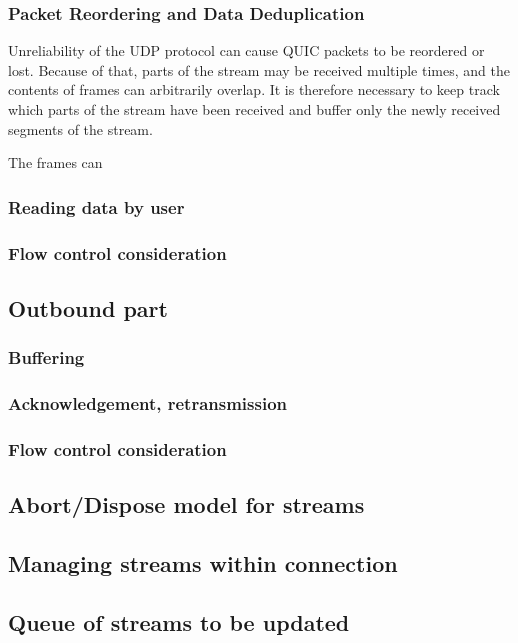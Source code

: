 \subsubsection{Packet Reordering and Data Deduplication}

Unreliability of the UDP protocol can cause QUIC packets to be reordered or lost. Because of that,
parts of the stream may be received multiple times, and the contents of \STREAM{} frames can
arbitrarily overlap. It is therefore necessary to keep track which parts of the stream have been
received and buffer only the newly received segments of the stream.



The \STREAM{} frames can

\subsubsection{Reading data by user}
\subsubsection{Flow control consideration}

\subsection{Outbound part}

\subsubsection{Buffering}
\subsubsection{Acknowledgement, retransmission}
\subsubsection{Flow control consideration}

\subsection{Abort/Dispose model for streams}
\subsection{Managing streams within connection}
\subsection{Queue of streams to be updated}


